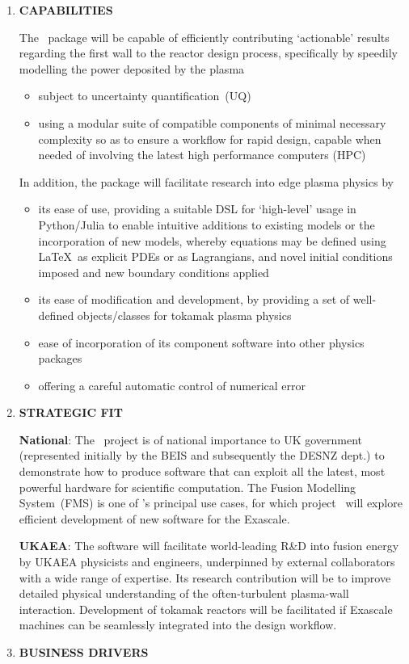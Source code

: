 \begin{enumerate}
\item  {\bf CAPABILITIES}

The \nep \ package will be capable of efficiently contributing `actionable' results regarding
the first wall to the reactor design process, specifically by speedily modelling the power deposited by the plasma
\begin{itemize}
\item subject to uncertainty quantification~(UQ)
\item using a modular suite of compatible components of minimal necessary complexity 
so as to ensure a workflow for rapid design,
capable when needed of involving the latest high performance computers (HPC)
\end{itemize}
In addition, the package will facilitate  research into edge plasma physics by
\begin{itemize}
\item its ease of use, providing a suitable DSL for `high-level' usage in Python/Julia to enable
intuitive additions to existing models or the incorporation of new models, whereby
equations may be defined using \LaTeX \ as explicit PDEs or as Lagrangians, %
and novel initial conditions imposed and new boundary conditions applied
\item its ease of modification and development, by
providing a set of well-defined objects/classes for tokamak plasma physics
\item ease of incorporation of its component software into other physics packages
\item offering a careful automatic control of numerical error
\end{itemize}

\item  {\bf STRATEGIC FIT} %

{\bf National}: The \exc \ project is of national importance to UK government
(represented initially by the BEIS and subsequently the DESNZ dept.)  to demonstrate
how to produce software that can exploit all the latest, most powerful hardware
for scientific computation.  The Fusion Modelling System~(FMS) is one
of \exc 's principal use cases, for which project \nep \ will explore efficient development of
new software for the Exascale.

{\bf UKAEA}: The software will facilitate world-leading R\&D into fusion energy by UKAEA physicists and
engineers, underpinned by external collaborators with a wide range of expertise.
Its research contribution will be to improve detailed physical understanding
of the often-turbulent plasma-wall interaction. Development of tokamak reactors will
be facilitated if Exascale machines can be seamlessly integrated into the design workflow.
\item  {\bf BUSINESS DRIVERS} %


\end{enumerate}
